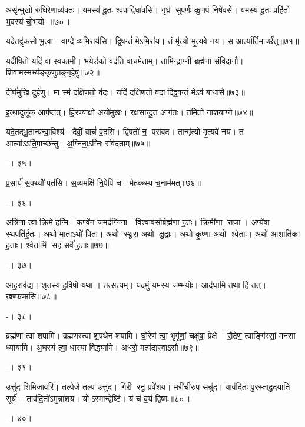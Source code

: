 असृ॑न्मुखो रुधि॒रेणा॒व्य॑क्तः। य॒मस्य॑ दू॒तः  श्वपा॒द्विधा॑वसि। गृध्र॑ सुप॒र्णः कु॒णपं॒ निषे॑वसे। य॒मस्य॑ दू॒तः प्रहि॑तो भ॒वस्य॑ चो॒भयो॥७०॥
\anuvakamend

यदे॒तद्वृ॑क॒सो भू॒त्वा। वाग्देव्यभि॒राय॑सि। द्वि॒षन्तं॑ मे॒ऽभिरा॑य। तं मृ॑त्यो मृ॒त्यवे॑ नय। स आर्त्यार्ति॒मार्च्छ॑तु॥७१॥
\anuvakamend

यदी॑षि॒तो यदि॑ वा स्वका॒मी। भ॒येड॑को वद॑ति॒ वाच॑मे॒ताम्। तामि॑न्द्रा॒ग्नी ब्रह्म॑णा संविदा॒नौ। शि॒वाम॒स्मभ्य॑ङ्कृणुतङ्गृ॒हेषु॑॥७२॥
\anuvakamend

दीर्घ॑मुखि॒ दुर्\mbox{}ह॑णु। मा स्म॑ दक्षिण॒तो व॑दः। यदि॑ दक्षिण॒तो वदाद्द्वि॒षन्तं॒ मेऽव॑ बाधासै॥७३॥
\anuvakamend

इ॒त्थादुलू॑क॒ आप॑प्तत्। हि॒र॒ण्या॒क्षो अयो॑मुखः। रक्ष॑सान्दू॒त आग॑तः। तमि॒तो ना॑शयाग्ने॥७४॥
\anuvakamend


यदे॒तद्भू॒तान्य॑न्वा॒विश्य॑। दैवीं॒ वाचं॑ व॒दसि॑। द्वि॒षतो॑ न॒ परा॑वद। तान्मृ॑त्यो मृ॒त्यवे॑ नय। त आर्त्याऽऽर्ति॒मार्च्छ॑न्तु। अ॒ग्निना॒ऽग्निः संव॑दताम्॥७५॥

-। ३५।
\anuvakamend


प्र॒सार्य॑ स॒क्थ्यौ॑ पत॑सि। स॒व्यमक्षि॑ नि॒पेपि॑ च। मेहक॑स्य च॒नाम॑मत्॥७६॥

-। ३६।
\anuvakamend


अत्रि॑णा त्वा क्रिमे हन्मि। कण्वे॑न ज॒मद॑ग्निना। वि॒श्वाव॑सो॒र्ब्रह्म॑णा ह॒तः। क्रिमी॑णा॒ राजा। अप्ये॑षा स्थ॒पति॑र्ह॒तः। अथो॑ मा॒ताऽथो॑ पि॒ता। अथो स्थू॒रा अथो क्षु॒द्राः। अथो॑ कृ॒ष्णा अथो श्वे॒ताः। अथो॑ आ॒शाति॑का ह॒ताः। श्वे॒ताभि॑ स॒ह सर्वे॑ ह॒ताः॥७७॥

-। ३७।
\anuvakamend


आह॒राव॑द्य। शृ॒तस्य॑ ह॒विषो॒ यथा। तत्स॒त्यम्। यद॒मुं य॒मस्य॒ जम्भ॑योः। आद॑धामि॒ तथा॒ हि तत्। खण्फण्म्रसि॑॥७८॥

-। ३८।
\anuvakamend


ब्रह्म॑णा त्वा शपामि। ब्रह्म॑णस्त्वा श॒पथे॑न शपामि। घो॒रेण॑ त्वा॒ भृगू॑णां॒ चक्षु॑षा॒ प्रेक्षे। रौ॒द्रेण॒ त्वाङ्गि॑रसां॒ मन॑सा ध्यायामि। अ॒घस्य॑ त्वा॒ धार॑या विद्ध्यामि। अध॑रो॒ मत्प॑द्यस्वाऽसौ॥७९॥

-। ३९।
\anuvakamend


उत्तु॑द शिमिजावरि। तल्पे॑जे॒ तल्प॒ उत्तु॑द। गि॒री रनु॒ प्रवे॑शय। मरी॑ची॒रुप॒ सन्नु॑द। याव॑दि॒तः पु॒रस्ता॑दु॒दया॑ति॒ सूर्य॑। ताव॑दि॒तो॑ऽमुन्ना॑शय। योऽस्मान्द्वेष्टि॑। यं च॑ व॒यं द्वि॒ष्मः॥८०॥

-। ४०।
\anuvakamend


